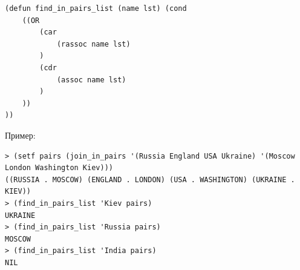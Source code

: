 \newpage
\vspace*{10mm}

\begin{lstlisting}[caption=Функция поиска в списке точечных пар]
(defun find_in_pairs_list (name lst) (cond 
	((OR
		(car 
			(rassoc name lst)
		)
		(cdr
			(assoc name lst)
		)
	))
))
\end{lstlisting}

Пример:
\begin{lstlisting}
> (setf pairs (join_in_pairs '(Russia England USA Ukraine) '(Moscow London Washington Kiev)))
((RUSSIA . MOSCOW) (ENGLAND . LONDON) (USA . WASHINGTON) (UKRAINE . KIEV))
> (find_in_pairs_list 'Kiev pairs)
UKRAINE
> (find_in_pairs_list 'Russia pairs)
MOSCOW
> (find_in_pairs_list 'India pairs)
NIL
\end{lstlisting}

